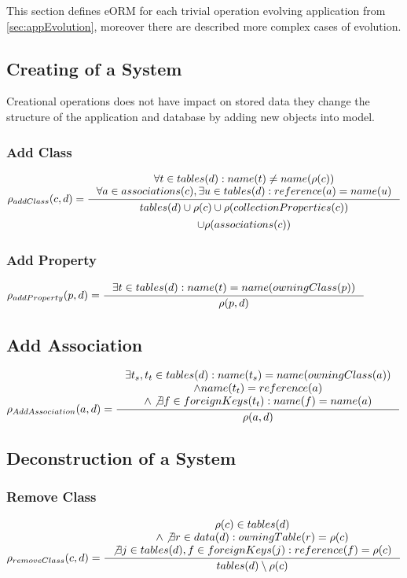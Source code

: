 \documentclass[11pt]{article}
\begin{document}
This section defines eORM for each trivial operation evolving application from \ref{sec:appEvolution}, moreover there are described more complex cases of evolution. 
 
\subsection{Creating of a System}
Creational operations does not have impact on stored data they change the structure of the application and database by adding new objects into model.

\subsubsection{Add Class}

$
\rho_{addClass}(c, d) = \inference{\forall t \in tables(d) : name(t) \neq name(\rho(c)) \\
	\forall a \in associations(c), \exists u \in  tables(d) : reference(a) = name(u) 
}{
\begin{gathered}
tables(d) \cup \rho(c) \cup \rho(collectionProperties(c)) \\ \cup \rho(associations(c))
\end{gathered}
}
$
\subsubsection{Add Property}
$
\rho_{addProperty}(p, d) = 
\inference{\exists t \in tables(d) : name(t) = name(owningClass(p))}{\rho(p,d)} 
$
\subsection{Add Association}
$
\rho_{AddAssociation}(a, d) = \inference{\exists t_s, t_t \in tables(d) : name(t_s) = name(owningClass(a)) \\ \wedge name(t_t) = reference(a) \\ \wedge \not \exists f \in foreignKeys(t_t) : name(f) = name(a) }{\rho(a,d)}
$


\subsection{Deconstruction of a System}
\subsubsection{Remove Class}
$
\rho_{removeClass}(c,d) = \inference{\rho(c) \in tables(d) \\ \wedge \not \exists r \in data(d) : owningTable(r) = \rho(c) \\ \not \exists j \in tables(d), f \in foreignKeys(j) : reference(f) = \rho(c)  }{tables(d) \setminus \rho(c)}
$
\end{document}
